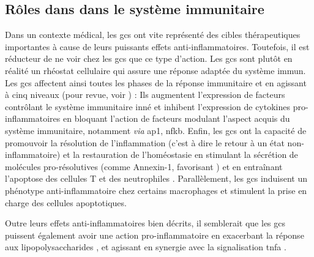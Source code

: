 \documentclass[../main.tex]{subfiles}
\begin{document}

\subsection{Rôles dans dans le système immunitaire}\label{subsec:gc-immune}
Dans un contexte médical, les \glspl{gc} ont vite représenté des cibles thérapeutiques importantes à cause de leurs puissants effets anti-inflammatoires.
Toutefois, il est réducteur de ne voir chez les \glspl{gc} que ce type d'action.
Les \glspl{gc} sont plutôt en réalité un rhéostat cellulaire qui assure une réponse adaptée du système immun.
Les \glspl{gc} affectent ainsi toutes les phases de la réponse immunitaire et en agissant à cinq niveaux (pour revue, voir \citealp{Busillo2013}) :
Ils augmentent l'expression de facteurs contrôlant le système immunitaire inné et inhibent l'expression de cytokines pro-inflammatoires en bloquant l'action de facteurs modulant l'aspect acquis du système immunitaire, notamment \textit{via} \gls{ap1}, \gls{nfkb}.
Enfin, les \glspl{gc} ont la capacité de promouvoir la résolution de l'inflammation (c'est à dire le retour à un état non-inflammatoire) et la restauration de l'homéostasie en stimulant la sécrétion de molécules pro-résolutives (comme Annexin-1, favorisant ) et en entraînant l'apoptose des cellules T et des neutrophiles \citep{Parrillo1979}.
Parallèlement, les \glspl{gc} induisent un phénotype anti-inflammatoire chez certains macrophages et stimulent la prise en charge des cellules apoptotiques.
\par
Outre leurs effets anti-inflammatoires bien décrits, il semblerait que les \glspl{gc} puissent également avoir une action pro-inflammatoire en exacerbant la réponse aux lipopolysaccharides \citep{Munhoz2010,Frank2012}, et agissant en synergie avec la signalisation \gls{tnfa} \citep{Lannan2012}.

\end{document}
